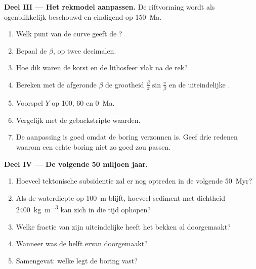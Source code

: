 \begin{problem}
\noindent\textbf{Deel III --- Het rekmodel aanpassen.} De riftvorming wordt als ogenblikkelijk beschouwd
en eindigend op \qty{150}{Ma}.
\begin{enumerate}[resume]
  \item Welk punt van de curve geeft de ?
  \item Bepaal de  $\beta$, op twee decimalen.
  \item Hoe dik waren de korst en de lithosfeer vlak na de rek?
  \item Bereken met de afgeronde $\beta$ de grootheid $\frac{\beta}{\pi}\sin\frac{\pi}{\beta}$ en de uiteindelijke
        .
  \item Voorspel $Y$ op 100, 60 en \qty{0}{Ma}.
  \item Vergelijk met de gebackstripte waarden.
  \item De aanpassing is goed omdat de boring verzonnen is. Geef drie redenen waarom een echte boring
        niet zo goed zou passen.
\end{enumerate}

\noindent\textbf{Deel IV --- De volgende 50 miljoen jaar.}
\begin{enumerate}[resume]
  \item Hoeveel tektonische subsidentie zal er nog optreden in de volgende \qty{50}{Myr}?
  \item Als de waterdiepte op \qty{100}{m} blijft, hoeveel sediment met dichtheid
        \qty{2400}{kg.m^{-3}} kan zich in die tijd ophopen?
  \item Welke fractie van zijn uiteindelijke  heeft het bekken al doorgemaakt?
  \item Wanneer was de helft ervan doorgemaakt?
  \item Samengevat: welke  legt de boring vast?
\end{enumerate}
\end{problem}
